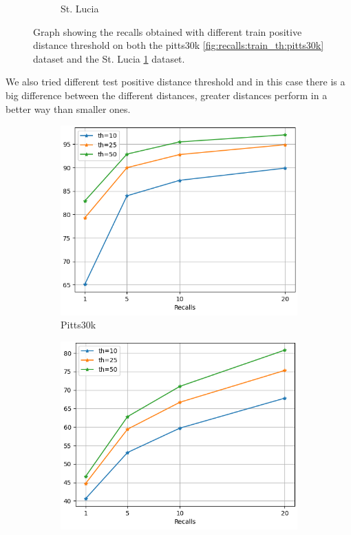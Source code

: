 \documentclass[10pt,twocolumn,letterpaper]{article}
\begin{document}
\begin{figure}
\begin{subfigure}[b]{0.23\textwidth}
		\caption{St. Lucia}
		\label{fig:recalls:train_th:st_lucia}
	\end{subfigure}
	\caption{Graph showing the recalls obtained with different train positive distance threshold on both the pitts30k \ref{fig:recalls:train_th:pitts30k} dataset and the St. Lucia \ref{fig:recalls:train_th:st_lucia} dataset.}
	\label{fig:recalls:train_th}
\end{figure}
We also tried different test positive distance threshold and in this case there is a big difference between the different distances, greater distances perform in a better way than smaller ones.\\
\begin{figure}
	\centering
	\begin{subfigure}[b]{0.23\textwidth}
		\centering
		\includegraphics[width=\textwidth]{img/test_th/test_pitts30k_recalls_graph.png}
		\caption{Pitts30k}
		\label{fig:recalls:test_th:pitts30k}
	\end{subfigure}
	\hfill
	\begin{subfigure}[b]{0.23\textwidth}
		\centering
		\includegraphics[width=\textwidth]{img/test_th/test_st_lucia_recalls_graph.png}

\end{subfigure}
\end{figure}
\end{document}
